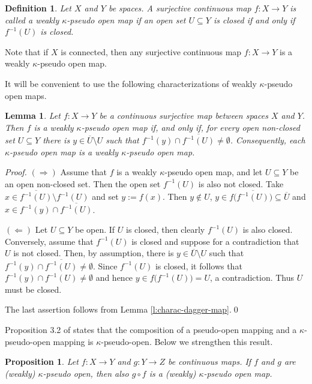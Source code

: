 \documentclass[preprint,11pt]{elsarticle}
\newtheorem{lemma}[theorem]{Lemma}
\newtheorem{proposition}[theorem]{Proposition}
\newtheorem{definition}[theorem]{Definition}
\numberwithin{equation}{section}
\numberwithin{theorem}{section}
\newcommand{\Ra}{\Rightarrow}
\newcommand{\SM}{{\setminus}}
\begin{document}
\begin{definition} \label{def:func-woca} {\em
Let $X$ and $Y$ be spaces. A surjective continuous map $f:X\to Y$ is called a {\em weakly $\kappa$-pseudo open map} if  an open set $U\subseteq Y$ is closed if and only if $f^{-1}(U)$ is closed.}
\end{definition}

Note that if $X$ is connected, then any surjective continuous map $f:X\to Y$ is a weakly  $\kappa$-pseudo open map.


It will be convenient to use the following characterizations of weakly $\kappa$-pseudo open maps.

\begin{lemma} \label{l:charac-dagger-map-weak}
Let $f:X\to Y$ be a continuous surjective map between spaces $X$ and $Y$. Then $f$ is a weakly $\kappa$-pseudo open map if, and only if, for every open non-closed set $U\subseteq Y$ there is  $y\in \overline{U}\SM U$ such that $f^{-1}(y)\cap \overline{f^{-1}(U)}\not=\emptyset$.
Consequently, each $\kappa$-pseudo open map is a weakly $\kappa$-pseudo open map.
\end{lemma}


\begin{proof}
$(\Ra)$ Assume that $f$ is a weakly $\kappa$-pseudo open map, and let  $U\subseteq Y$ be an open non-closed set. Then the open set $f^{-1}(U)$ is also not closed.  Take $x\in \overline{f^{-1}(U)}\SM f^{-1}(U)$ and set $y:=f(x)$. Then $y\not\in U$, $y\in f\big(\overline{f^{-1}(U)}\big)\subseteq \overline{U}$ and $x\in f^{-1}(y)\cap \overline{f^{-1}(U)}$.

$(\Leftarrow)$ Let $U\subseteq Y$ be open. If $U$ is closed, then clearly $f^{-1}(U)$ is also closed. Conversely, assume that $f^{-1}(U)$ is closed and suppose for a contradiction that $U$ is not closed. Then, by assumption, there is $y\in \overline{U}\SM U$ such that $f^{-1}(y)\cap \overline{f^{-1}(U)}\not=\emptyset$. Since $f^{-1}(U)$ is closed, it follows that  $f^{-1}(y)\cap f^{-1}(U)\not=\emptyset$ and hence $y\in f\big(f^{-1}(U)\big)=U$, a contradiction. Thus $U$ must be closed.
\smallskip

The last assertion follows from Lemma \ref{l:charac-dagger-map}.\qed
\end{proof}

Proposition 3.2 of \cite{LiL} states that the composition of a pseudo-open mapping and a $\kappa$-pseudo-open mapping is $\kappa$-pseudo-open. Below we strengthen this result.

\begin{proposition} \label{p:composition-dagger}
Let $f:X\to Y$ and $g:Y\to Z$ be continuous maps. If $f$ and $g$ are (weakly) $\kappa$-pseudo open, then also $g\circ f$ is a  (weakly) $\kappa$-pseudo open map.
\end{proposition}
\end{document}
